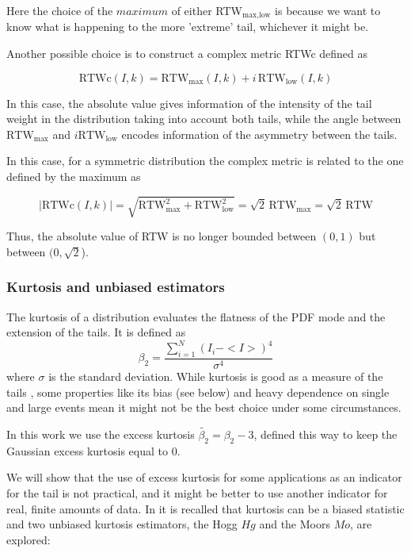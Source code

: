 	Here the choice of the $maximum$ of either RTW$_\textrm{max,low}$ is because we want to know what is happening to the more 'extreme' tail, whichever it might be. 
	
	
	Another possible choice is to construct a complex metric RTWc defined as
	
	\begin{equation}
		\mathrm{RTWc}(I,k)=\mathrm{RTW}_\textrm{max}(I,k) + i\, \mathrm{RTW}_\textrm{low}(I,k)
		\label{eq:RTWc}
	\end{equation}
	
	In this case, the absolute value gives information of the intensity of the tail weight in the distribution taking into account both tails, while the angle between $\textrm{RTW}_\textrm{max}$ and $i \textrm{RTW}_\textrm{low} $ encodes information of the asymmetry between the tails.
	
	In this case, for a symmetric distribution the complex metric is related to the one defined by the maximum as 
	
		\begin{equation}
	|\mathrm{RTWc}(I,k)|=\sqrt{\mathrm{RTW}_\textrm{max}^2+\mathrm{RTW}_\textrm{low}^2}=\sqrt{2}\,\mathrm{RTW}_\textrm{max}=\sqrt{2}\,\mathrm{RTW}
		\end{equation}
	
	Thus, the absolute value of RTW is no longer bounded between $(0,1)$ but between $(0,\sqrt{2}$).
	
	
	\subsubsection{Kurtosis and unbiased estimators}
	
	
	The kurtosis of a distribution evaluates the flatness of the PDF mode and the extension of the tails. It is defined as
	\begin{equation}
		\beta_2 = \frac{\sum_{i=1}^N{\left(I_i - <\!I\!>\right)^4}}{\sigma^4}
	\end{equation}
	where $\sigma$ is the standard deviation. While kurtosis is good as a measure of the tails \citep{kurtosisRIP}, some properties like its bias (see below) and heavy dependence on single and large events \citep{KIM200456} mean it might not be the best choice under some circumstances. 
	
	In this work we use the excess kurtosis $\tilde{\beta_2}=\beta_2-3$, defined this way to keep the Gaussian excess kurtosis equal to $0$.
	
	We will show that the use of excess kurtosis for some applications as an indicator for the tail is not practical, and it might be better to use another indicator for real, finite amounts of data. 
	In \cite{Bono_2019,KIM200456} it is recalled that kurtosis can be a biased statistic and two unbiased kurtosis estimators, the Hogg $Hg$ and the Moors $Mo$, are explored:
	
